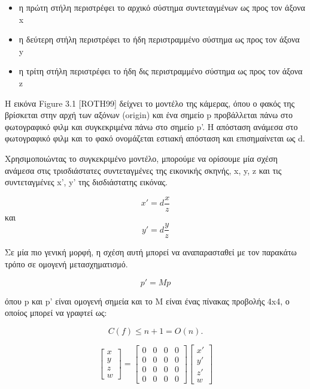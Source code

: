 \begin{itemize}
\item η πρώτη στήλη περιστρέφει το αρχικό σύστημα συντεταγμένων ως προς τον άξονα x
\item η δεύτερη στήλη περιστρέφει το ήδη περιστραμμένο σύστημα ως προς τον άξονα  y
\item η τρίτη στήλη περιστρέφει το ήδη δις περιστραμμένο σύστημα ως προς τον άξονα  z 
\end{itemize}










Η εικόνα Figure 3.1 [ROTH99] δείχνει το μοντέλο της κάμερας, όπου ο φακός της βρίσκεται στην αρχή των αξόνων (origin) και ένα σημείο p προβάλλεται πάνω στο φωτογραφικό φιλμ και συγκεκριμένα πάνω στο σημείο p'. Η απόσταση ανάμεσα στο φωτογραφικό φιλμ και το φακό ονομάζεται εστιακή απόσταση και επισημαίνεται ως d.


Χρησιμοποιώντας το συγκεκριμένο μοντέλο, μπορούμε να ορίσουμε μία σχέση ανάμεσα στις τρισδιάστατες συντεταγμένες της εικονικής σκηνής, x, y, z και τις συντεταγμένες x', y' της δισδιάστατης εικόνας. 

\[ x' = d  \frac{x}{z}\] και \[ y' = d  \frac{y}{z}\]

Σε μία πιο γενική μορφή, η σχέση αυτή μπορεί να αναπαρασταθεί με τον παρακάτω τρόπο σε ομογενή μετασχηματισμό.

\[ p' = Mp\] 

όπου p και p’ είναι ομογενή σημεία και το M είναι ένας πίνακας προβολής 4x4, ο οποίος μπορεί να γραφτεί ως:


\begin{equation}
C(f) \leq n + 1 = O(n).
\end{equation}


\begin{equation}
\begin{bmatrix}
x\\ 
y\\ 
z\\ 
w
\end{bmatrix}
=
\begin{bmatrix}
0 & 0 & 0 & 0 \\ 
0 & 0 & 0 & 0 \\ 
0 &  0  & 0  & 0 \\ 
0 & 0  & 0 & 0
\end{bmatrix}
\begin{bmatrix}
x'\\ 
y'\\ 
z'\\ 
w
\end{bmatrix}
\end{equation}


